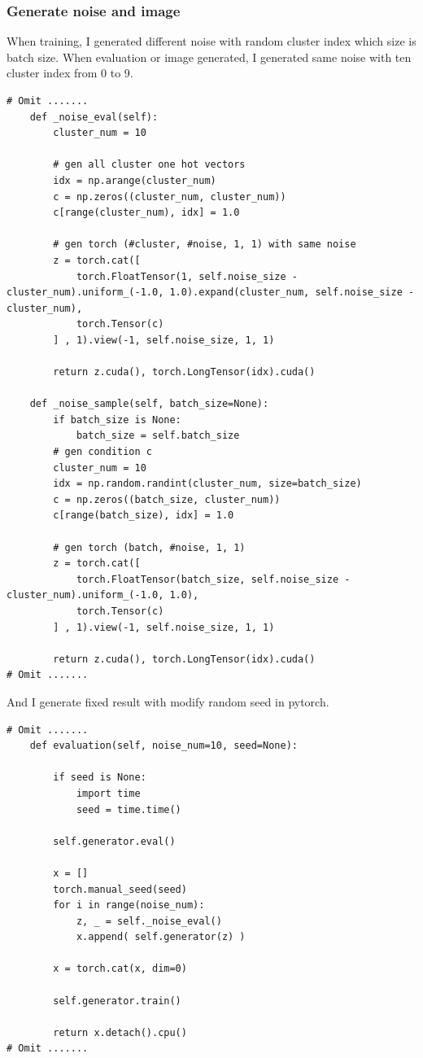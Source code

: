 \documentclass[12pt]{article}
\begin{document}
\subsubsection{Generate noise and image}

When training, I generated different noise with random cluster index which size is batch size. When evaluation or image generated, I generated same noise with ten cluster index from 0 to 9.

\begin{verbatim}
# Omit .......
    def _noise_eval(self):
        cluster_num = 10
        
        # gen all cluster one hot vectors
        idx = np.arange(cluster_num)
        c = np.zeros((cluster_num, cluster_num))
        c[range(cluster_num), idx] = 1.0
        
        # gen torch (#cluster, #noise, 1, 1) with same noise
        z = torch.cat([
            torch.FloatTensor(1, self.noise_size - cluster_num).uniform_(-1.0, 1.0).expand(cluster_num, self.noise_size - cluster_num), 
            torch.Tensor(c)
        ] , 1).view(-1, self.noise_size, 1, 1)
        
        return z.cuda(), torch.LongTensor(idx).cuda()
        
    def _noise_sample(self, batch_size=None):
        if batch_size is None:
            batch_size = self.batch_size
        # gen condition c
        cluster_num = 10
        idx = np.random.randint(cluster_num, size=batch_size)
        c = np.zeros((batch_size, cluster_num))
        c[range(batch_size), idx] = 1.0
        
        # gen torch (batch, #noise, 1, 1)
        z = torch.cat([
            torch.FloatTensor(batch_size, self.noise_size - cluster_num).uniform_(-1.0, 1.0), 
            torch.Tensor(c)
        ] , 1).view(-1, self.noise_size, 1, 1)
        
        return z.cuda(), torch.LongTensor(idx).cuda()
# Omit .......
\end{verbatim}

And I generate fixed result with modify random seed in pytorch.

\begin{verbatim}
# Omit .......
    def evaluation(self, noise_num=10, seed=None):
        
        if seed is None:
            import time
            seed = time.time()
        
        self.generator.eval()
        
        x = []
        torch.manual_seed(seed)
        for i in range(noise_num):
            z, _ = self._noise_eval()
            x.append( self.generator(z) )
        
        x = torch.cat(x, dim=0)
        
        self.generator.train()
        
        return x.detach().cpu()
# Omit .......
\end{verbatim}
\end{document}

